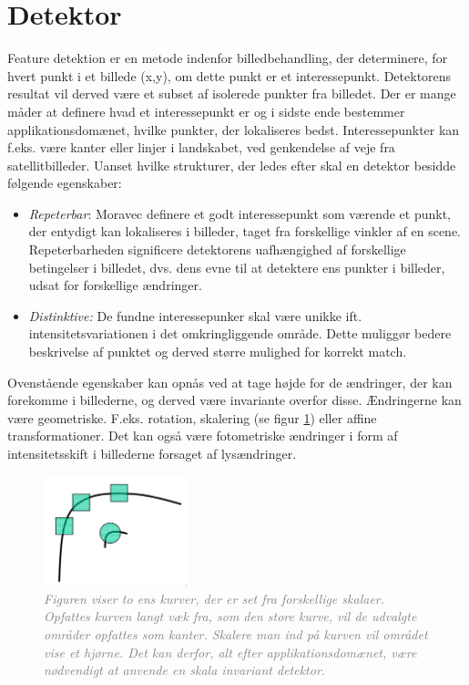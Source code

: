 \section{Detektor}\label{sec:detect}
Feature detektion er en metode indenfor billedbehandling, der determinere, for hvert punkt i et billede (x,y), om dette punkt er et interessepunkt. Detektorens resultat vil derved være et subset af isolerede punkter fra billedet. Der er mange måder at definere hvad et interessepunkt er og i sidste ende bestemmer applikationsdomænet, hvilke punkter, der lokaliseres bedst. Interessepunkter kan f.eks. være kanter eller linjer i landskabet, ved genkendelse af veje fra satellitbilleder. Uanset hvilke strukturer, der ledes efter skal en detektor besidde følgende egenskaber:
\begin{itemize}
\item{\emph{Repeterbar}: Moravec \cite{moravec} definere et godt interessepunkt som værende et punkt, der entydigt kan lokaliseres i billeder, taget fra forskellige vinkler af en scene. Repeterbarheden significere detektorens uafhængighed af forskellige betingelser i billedet, dvs. dens evne til at detektere ens punkter i billeder, udsat for forskellige ændringer. }
\item{\emph{Distinktive:}
De fundne interessepunker skal være unikke ift. intensitetsvariationen i det omkringliggende område. Dette muliggør bedere beskrivelse af punktet og derved større mulighed for korrekt match.}
\end{itemize}
Ovenstående egenskaber kan opnås ved at tage højde for de ændringer, der kan forekomme i billederne, og derved være invariante overfor disse. Ændringerne kan være geometriske. F.eks. rotation, skalering (se figur \ref{fig:skal}) eller affine transformationer. Det kan også være fotometriske ændringer i form af intensitetsskift i billederne forsaget af lysændringer.
\begin{figure}[H]
    \centering
    \includegraphics[width=0.37\textwidth]{fig/28.png}
     \vspace{-1em}
    \begin{center}    
       \caption{\textcolor{gray}{\footnotesize \textit{Figuren viser to ens kurver, der er set fra forskellige skalaer. Opfattes kurven langt væk fra, som den store kurve, vil de udvalgte områder opfattes som kanter. Skalere man ind på kurven vil området vise et hjørne. Det kan derfor, alt efter applikationsdomænet, være nødvendigt at anvende en skala invariant detektor.}}}
    \label{fig:skal}
     \end{center}
     \vspace{-2.5em}
  \end{figure} \noindent
